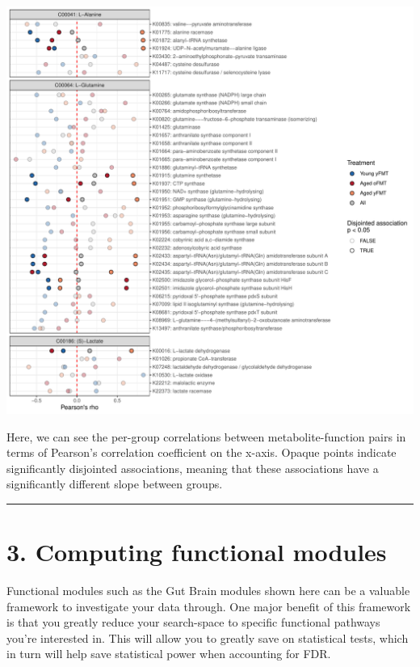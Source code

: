 \documentclass[
]{article}
\begin{document}
\includegraphics{README_part2_files/figure-latex/plot_FMT-1.pdf}

Here, we can see the per-group correlations between metabolite-function
pairs in terms of Pearson's correlation coefficient on the x-axis.
Opaque points indicate significantly disjointed associations, meaning
that these associations have a significantly different slope between
groups.

\begin{center}\rule{0.5\linewidth}{0.5pt}\end{center}

\newpage

\hypertarget{computing-functional-modules}{%
\section{3. Computing functional
modules}\label{computing-functional-modules}}

Functional modules such as the Gut Brain modules shown here can be a
valuable framework to investigate your data through. One major benefit
of this framework is that you greatly reduce your search-space to
specific functional pathways you're interested in. This will allow you
to greatly save on statistical tests, which in turn will help save
statistical power when accounting for FDR.
\end{document}
